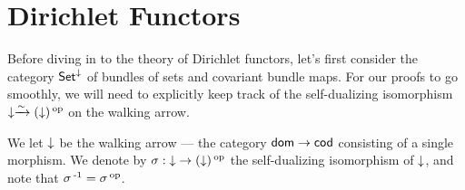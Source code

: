 \section{Dirichlet Functors} \label{sec:set.level}

Before diving in to the theory of Dirichlet functors, let's first consider the
category $\operatorname{\mathsf{{Set}}}^{\mathbin{\downarrow}}$ of bundles of sets and covariant bundle maps. For our
proofs to go smoothly, we will need to explicitly keep track of the
self-dualizing isomorphism $\downarrow \xrightarrow{\sim} (\downarrow)\operatorname{^\textnormal{op}}$ on the walking arrow.

\begin{defn}
  We let $\mathbin{\downarrow}$ be the walking arrow --- the category $\mathsf{{dom}} \to
  \mathsf{{cod}}$ consisting of a single morphism. We denote by $\sigma : \mathbin{\downarrow}
  \to (\downarrow)\operatorname{^\textnormal{op}}$ the self-dualizing isomorphism of $\mathbin{\downarrow}$, and note
  that $\sigma\operatorname{^{-1}} = \sigma\operatorname{^\textnormal{op}}$.
\end{defn}

